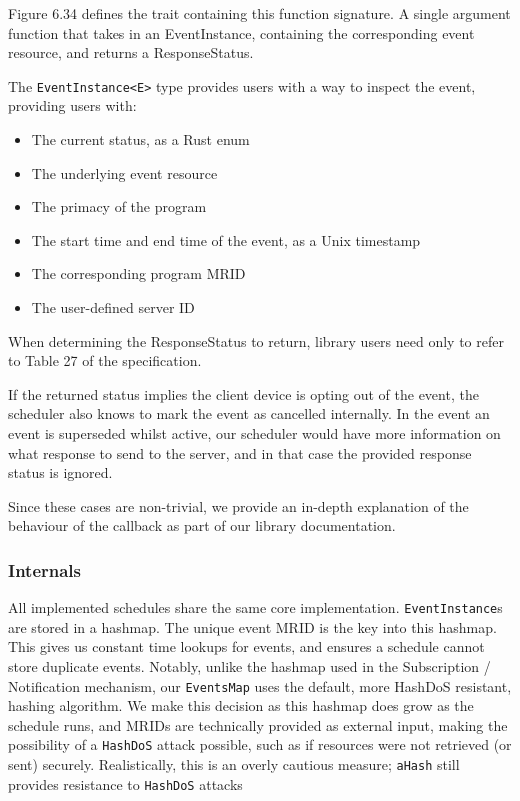 Figure 6.34 defines the trait containing this function signature. A single argument function that takes in an EventInstance, containing the corresponding event resource, and returns a ResponseStatus. 

The \texttt{EventInstance<E>} type provides users with a way to inspect the event, providing users with:

\begin{itemize}
    \item The current status, as a Rust enum
    \item The underlying event resource
    \item The primacy of the program
    \item The start time and end time of the event, as a Unix timestamp
    \item The corresponding program MRID
    \item The user-defined server ID
\end{itemize}

When determining the ResponseStatus to return, library users need only to refer to Table 27 of the specification.

If the returned status implies the client device is opting out of the event, the scheduler also knows to mark the event as cancelled internally. In the event an event is superseded whilst active, our scheduler would have more information on what response to send to the server, and in that case the provided response status is ignored.

Since these cases are non-trivial, we provide an in-depth explanation of the behaviour of the callback as part of our library documentation.

\subsubsection{Internals}
All implemented schedules share the same core implementation. \texttt{EventInstance}s are stored in a hashmap. The unique event MRID is the key into this hashmap. This gives us constant time lookups for events, and ensures a schedule cannot store duplicate events. Notably, unlike the hashmap used in the Subscription / Notification mechanism, our \texttt{EventsMap} uses the default, more HashDoS resistant, hashing algorithm. We make this decision as this hashmap does grow as the schedule runs, and MRIDs are technically provided as external input, making the possibility of a \texttt{HashDoS} attack possible, such as if resources were not retrieved (or sent) securely.
Realistically, this is an overly cautious measure; \texttt{aHash} still provides resistance to \texttt{HashDoS} attacks

